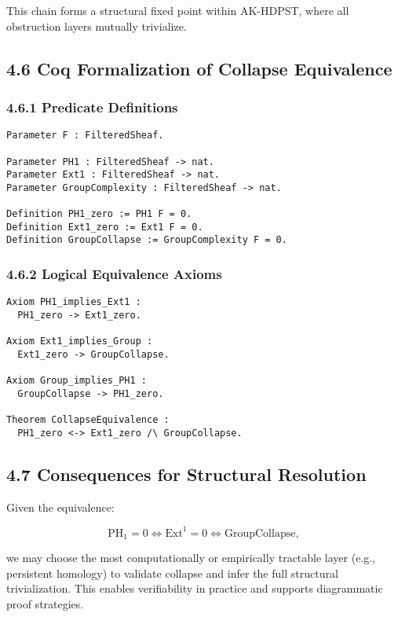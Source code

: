 \documentclass[11pt]{article}
\begin{document}
This chain forms a structural fixed point within AK-HDPST, where all obstruction layers mutually trivialize.

\subsection*{4.6 Coq Formalization of Collapse Equivalence}

\subsubsection*{4.6.1 Predicate Definitions}

\begin{lstlisting}[language=Coq, caption=Collapse Condition Predicates, captionpos=b]
Parameter F : FilteredSheaf.

Parameter PH1 : FilteredSheaf -> nat.
Parameter Ext1 : FilteredSheaf -> nat.
Parameter GroupComplexity : FilteredSheaf -> nat.

Definition PH1_zero := PH1 F = 0.
Definition Ext1_zero := Ext1 F = 0.
Definition GroupCollapse := GroupComplexity F = 0.
\end{lstlisting}

\subsubsection*{4.6.2 Logical Equivalence Axioms}

\begin{lstlisting}[language=Coq, caption=Collapse Equivalence Theorem, captionpos=b]
Axiom PH1_implies_Ext1 :
  PH1_zero -> Ext1_zero.

Axiom Ext1_implies_Group :
  Ext1_zero -> GroupCollapse.

Axiom Group_implies_PH1 :
  GroupCollapse -> PH1_zero.

Theorem CollapseEquivalence :
  PH1_zero <-> Ext1_zero /\ GroupCollapse.
\end{lstlisting}

\subsection*{4.7 Consequences for Structural Resolution}

Given the equivalence:

\[
\mathrm{PH}_1 = 0 \iff \mathrm{Ext}^1 = 0 \iff \mathrm{Group Collapse},
\]

we may choose the most computationally or empirically tractable layer (e.g., persistent homology) to validate collapse and infer the full structural trivialization. This enables verifiability in practice and supports diagrammatic proof strategies.
\end{document}
